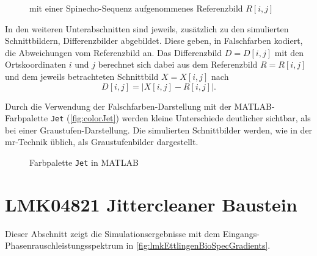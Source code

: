 \begin{figure}[H]
	\centering
	\caption[Referenzbild]{mit einer Spinecho-Sequenz aufgenommenes Referenzbild $R[i,j]$}
	\label{fig:R}
\end{figure}

In den weiteren Unterabschnitten sind jeweils, zusätzlich zu den simulierten Schnittbildern, Differenzbilder abgebildet. Diese geben, in Falschfarben kodiert, die Abweichungen vom Referenzbild an. Das Differenzbild $D=D[i,j]$ mit den Ortskoordinaten $i$ und $j$ berechnet sich dabei aus dem Referenzbild $R=R[i,j]$ und dem jeweils betrachteten Schnittbild $X=X[i,j]$ nach
\begin{equation}
	D[i,j]=\left| X[i,j]-R[i,j]\right|.
\end{equation}

Durch die Verwendung der Falschfarben-Darstellung mit der MATLAB-Farbpalette \texttt{Jet} (\autoref{fig:colorJet}) werden kleine Unterschiede deutlicher sichtbar, als bei einer Graustufen-Darstellung. Die simulierten Schnittbilder werden, wie in der \gls{mr}-Technik üblich, als Graustufenbilder dargestellt.

\begin{figure}[H]
	\centering
	\caption[]{Farbpalette \texttt{Jet} in MATLAB}
	\label{fig:colorJet}
\end{figure}






\clearpage
\section{LMK04821 Jittercleaner Baustein}
Dieser Abschnitt zeigt die Simulationsergebnisse mit dem Eingangs-Phasen\-rausch\-leistungs\-spektrum in \autoref{fig:lmkEttlingenBioSpecGradients}.

